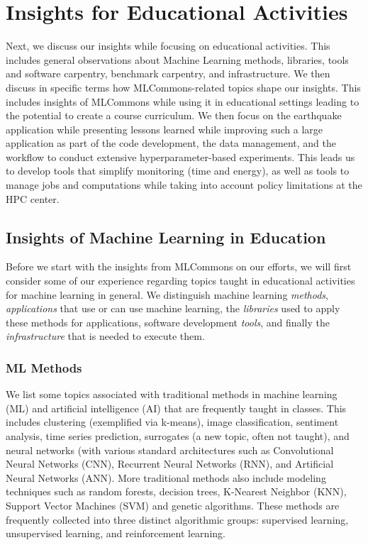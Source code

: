\documentclass[utf8]{FrontiersinVancouver} %
\begin{document}
\section{Insights for Educational Activities}

Next, we discuss our insights while focusing on educational activities. This includes general observations about Machine Learning methods, libraries, tools and software carpentry, benchmark carpentry, and infrastructure. We then discuss in specific terms how MLCommons-related topics shape our insights. This includes insights of MLCommons while using it in educational settings leading to the potential to create a course curriculum. We then focus on the earthquake application while presenting lessons learned while improving such a large application as part of the code development, the data management, and the workflow to conduct extensive hyperparameter-based experiments. This leads us to develop tools that simplify monitoring (time and energy), as well as tools to manage jobs and computations while taking into account policy limitations at the HPC center.

\subsection{Insights of Machine Learning in Education}
\label{sec:edu-ml}

Before we start with the insights from MLCommons on our efforts, we will first consider some of our experience regarding topics taught in educational activities for machine learning in general. We distinguish machine learning {\em methods}, {\em applications} that use or can use machine learning, the {\em libraries} used to apply these methods for applications, software development {\em tools}, and finally the {\em
  infrastructure} that is needed to execute them.


\subsubsection{ML Methods}

We list some topics associated with traditional methods in machine learning (ML) and artificial intelligence (AI) that are frequently taught in classes. This includes clustering (exemplified via k-means), image classification, sentiment analysis, time series prediction, surrogates (a new topic, often not taught), and neural networks (with various standard architectures such as Convolutional Neural Networks (CNN), Recurrent Neural Networks (RNN), and Artificial Neural Networks (ANN).  More traditional methods also include modeling techniques such as random forests, decision trees, K-Nearest Neighbor (KNN), Support Vector Machines (SVM) and genetic algorithms.  These methods are frequently collected into three distinct algorithmic groups: supervised learning, unsupervised learning, and reinforcement learning.
\end{document}
